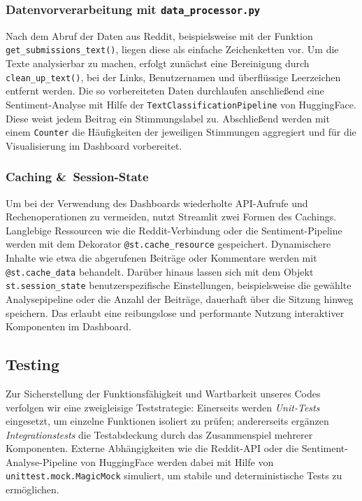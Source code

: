 \subsubsection{Datenvorverarbeitung mit \texttt{data\_processor.py}}
Nach dem Abruf der Daten aus Reddit, \newline
beispielsweise mit der Funktion \texttt{get\_submissions\_text()}, liegen diese als einfache Zeichenketten vor.
Um die Texte analysierbar zu machen, erfolgt zunächst eine Bereinigung durch \texttt{clean\_up\_text()}, bei der Links, Benutzernamen und überflüssige Leerzeichen entfernt werden.
Die so vorbereiteten Daten durchlaufen anschließend eine Sentiment-Analyse \newline
mit Hilfe der \texttt{TextClassificationPipeline} von HuggingFace.
Diese weist jedem Beitrag ein Stimmungslabel zu.
Abschließend werden mit einem \texttt{Counter} die Häufigkeiten der jeweiligen Stimmungen aggregiert und für die Visualisierung im Dashboard vorbereitet.

\subsubsection{Caching \&~Session-State}
Um bei der Verwendung des Dashboards wiederholte API-Aufrufe und Rechenoperationen zu vermeiden, nutzt Streamlit zwei Formen des Cachings.
Langlebige Ressourcen wie die Reddit-Verbindung oder die Sentiment-Pipeline werden mit dem Dekorator \texttt{@st.cache\_resource} gespeichert.
Dynamischere Inhalte wie etwa die abgerufenen Beiträge oder Kommentare werden mit \texttt{@st.cache\_data} behandelt.
Darüber hinaus lassen sich mit dem Objekt \texttt{st.session\_state} benutzerspezifische Einstellungen, beispielsweise die gewählte Analysepipeline oder die Anzahl der Beiträge, dauerhaft über die Sitzung hinweg speichern.
Das erlaubt eine reibungslose und performante Nutzung interaktiver Komponenten im Dashboard.

\subsection{Testing}
Zur Sicherstellung der Funktionsfähigkeit und Wartbarkeit unseres Codes \newline
verfolgen wir eine zweigleisige Teststrategie: Einerseits werden \emph{Unit-Tests} eingesetzt, um einzelne Funktionen isoliert zu prüfen; andererseits ergänzen \emph{Integrationstests} die Testabdeckung durch das Zusammenspiel mehrerer Komponenten. Externe Abhängigkeiten wie die Reddit-API oder die Sentiment-Analyse-Pipeline von HuggingFace werden dabei mit Hilfe von \texttt{unittest.mock.MagicMock} simuliert, um stabile und deterministische Tests zu ermöglichen.

